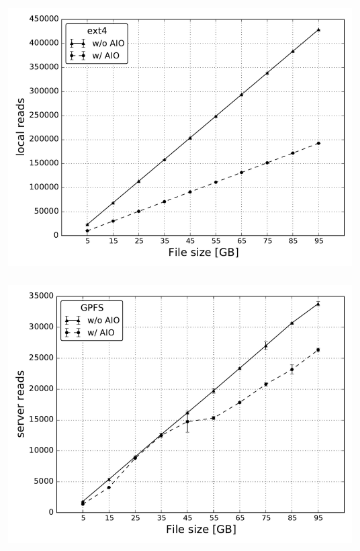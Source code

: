 \begin{figure}[!htb]
  \centering
  \begin{subfigure}[t]{0.32\textwidth}
    \centering
    \includegraphics[width=\textwidth]{chapters/chapter2/figures/SC2015/ROOT/separate_plots/test_cluster/ext4/reads}
    \caption{\textit{}}
    \label{figure: ext4_3}
  \end{subfigure}
  \begin{subfigure}[t]{0.32\textwidth}
    \centering
    \includegraphics[width=\textwidth]{chapters/chapter2/figures/SC2015/ROOT/separate_plots/test_cluster/gpfs/server_reads}
    \caption{\textit{}}
    \label{figure: gpfs_3}
  \end{subfigure}
  \begin{subfigure}[t]{0.32\textwidth}

\end{subfigure}
\end{figure}
